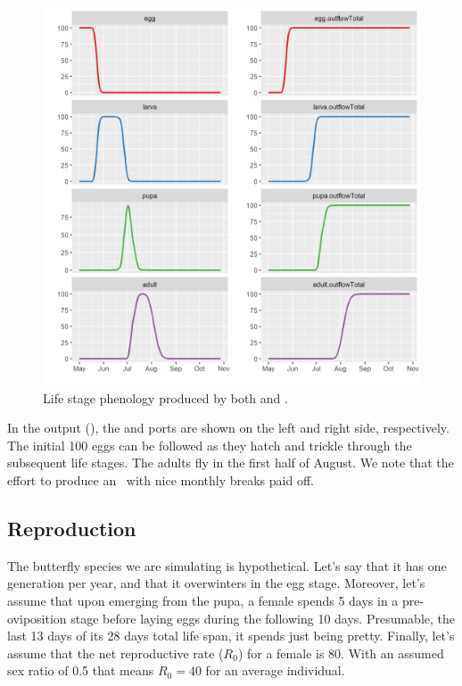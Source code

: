 \begin{figure} [ht]
\centering
\includegraphics[width=\textwidth]{graphics/butterfly2}
\caption{Life stage phenology produced by both  and .}
\label{fig:butterfly2}
\end{figure}

In the output (), the  and  ports are shown on the left and right side, respectively. The initial 100 eggs can be followed as they hatch and trickle through the subsequent life stages. The adults fly in the first half of August. We note that the effort to produce an \xaxis\ with nice monthly breaks paid off.

\subsection{Reproduction}
The butterfly species we are simulating is hypothetical. Let's say that it has one generation per year, and that it overwinters in the egg stage. Moreover, let's assume that upon emerging from the pupa, a female spends 5 days in a pre-oviposition stage before laying eggs during the following 10 days. Presumable, the last 13 days of its 28 days total life span, it spends just being pretty. Finally, let's assume that the net reproductive rate ($R_0$) for a female is 80. With an assumed sex ratio of 0.5 that means $R_0=40$ for an average individual.

